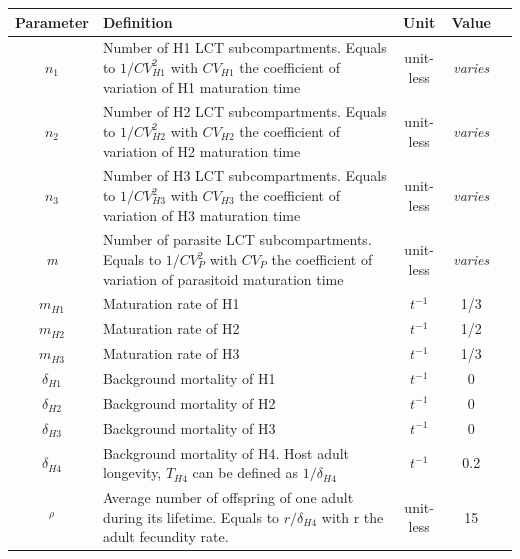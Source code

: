 \documentclass[12pt,a4paper,onecolumn]{article}
\begin{document}
\begin{table}[htb]
\centering
\footnotesize
\begin{tabularx}{\linewidth}{c >{\raggedright\arraybackslash}X c c c}
\toprule
Parameter & Definition & Unit & Value \\

\midrule
$n_1$ & Number of H1 LCT subcompartments. Equals to $1/CV_{H1}^2$ with $CV_{H1}$ the
coefficient of variation of H1 maturation time & unit-less & \textit{varies}  \\

$n_2$ & Number of H2 LCT subcompartments. Equals to $1/CV_{H2}^2$ with $CV_{H2}$ the
coefficient of variation of H2 maturation time & unit-less & \textit{varies}  \\

$n_3$ & Number of H3 LCT subcompartments. Equals to $1/CV_{H3}^2$ with $CV_{H3}$ the
coefficient of variation of H3 maturation time & unit-less & \textit{varies}  \\

\textit{m} & Number of parasite LCT subcompartments. Equals to $1/CV_P^2$ with $CV_P$ the
coefficient of variation of parasitoid maturation time & unit-less & \textit{varies}  \\

$m_{H1}$ & Maturation rate of H1 & $t^{-1}$ & 1/3 \\
$m_{H2}$ & Maturation rate of H2 & $t^{-1}$ & 1/2  \\
$m_{H3}$ & Maturation rate of H3 & $t^{-1}$ & 1/3  \\

$\delta_{H1}$ & Background mortality of H1 & $t^{-1}$ & 0  \\
$\delta_{H2}$ & Background mortality of H2 & $t^{-1}$ & 0  \\
$\delta_{H3}$ & Background mortality of H3 & $t^{-1}$ & 0  \\
$\delta_{H4}$ & Background mortality of H4. Host adult longevity, $T_{H4}$ can be defined as $1/\delta_{H4}$ & $t^{-1}$ &  0.2 \\
$^\rho$ & Average number of offspring of one adult during its lifetime. Equals to $r/\delta_{H4}$ with r the adult fecundity rate. & unit-less & 15  \\


\end{tabularx}
\end{table}
\end{document}
